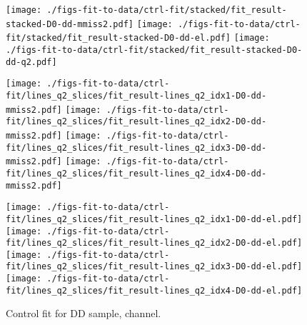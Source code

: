 \begin{figure}[htb]
    \centering
    \texttt{[image: ./figs-fit-to-data/ctrl-fit/stacked/fit\_result-stacked-D0-dd-mmiss2.pdf]}
    \texttt{[image: ./figs-fit-to-data/ctrl-fit/stacked/fit\_result-stacked-D0-dd-el.pdf]}
    \texttt{[image: ./figs-fit-to-data/ctrl-fit/stacked/fit\_result-stacked-D0-dd-q2.pdf]}

    \texttt{[image: ./figs-fit-to-data/ctrl-fit/lines\_q2\_slices/fit\_result-lines\_q2\_idx1-D0-dd-mmiss2.pdf]}
    \texttt{[image: ./figs-fit-to-data/ctrl-fit/lines\_q2\_slices/fit\_result-lines\_q2\_idx2-D0-dd-mmiss2.pdf]}
    \texttt{[image: ./figs-fit-to-data/ctrl-fit/lines\_q2\_slices/fit\_result-lines\_q2\_idx3-D0-dd-mmiss2.pdf]}
    \texttt{[image: ./figs-fit-to-data/ctrl-fit/lines\_q2\_slices/fit\_result-lines\_q2\_idx4-D0-dd-mmiss2.pdf]}

    \texttt{[image: ./figs-fit-to-data/ctrl-fit/lines\_q2\_slices/fit\_result-lines\_q2\_idx1-D0-dd-el.pdf]}
    \texttt{[image: ./figs-fit-to-data/ctrl-fit/lines\_q2\_slices/fit\_result-lines\_q2\_idx2-D0-dd-el.pdf]}
    \texttt{[image: ./figs-fit-to-data/ctrl-fit/lines\_q2\_slices/fit\_result-lines\_q2\_idx3-D0-dd-el.pdf]}
    \texttt{[image: ./figs-fit-to-data/ctrl-fit/lines\_q2\_slices/fit\_result-lines\_q2\_idx4-D0-dd-el.pdf]}

    \caption{Control fit for DD sample, \Dz channel.}
    \label{fig:ctrl-dd-d0}
\end{figure}

